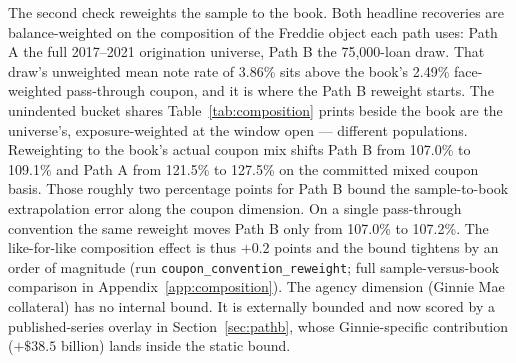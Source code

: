 The second check reweights the sample to the book. Both headline recoveries are balance-weighted on the composition of the Freddie object each path uses: Path A the full 2017--2021 origination universe, Path B the 75,000-loan draw. That draw's unweighted mean note rate of 3.86\% sits above the book's 2.49\% face-weighted pass-through coupon, and it is where the Path B reweight starts. The unindented bucket shares Table~\ref{tab:composition} prints beside the book are the universe's, exposure-weighted at the window open --- different populations. Reweighting to the book's actual coupon mix shifts Path B from 107.0\% to 109.1\% and Path A from 121.5\% to 127.5\% on the committed mixed coupon basis. Those roughly two percentage points for Path B bound the sample-to-book extrapolation error along the coupon dimension. On a single pass-through convention the same reweight moves Path B only from 107.0\% to 107.2\%. The like-for-like composition effect is thus $+0.2$ points and the bound tightens by an order of magnitude (run \texttt{coupon\_convention\_reweight}; full sample-versus-book comparison in Appendix~\ref{app:composition}). The agency dimension (Ginnie Mae collateral) has no internal bound. It is externally bounded and now scored by a published-series overlay in Section~\ref{sec:pathb}, whose Ginnie-specific contribution ($+\$38.5$ billion) lands inside the static bound.
